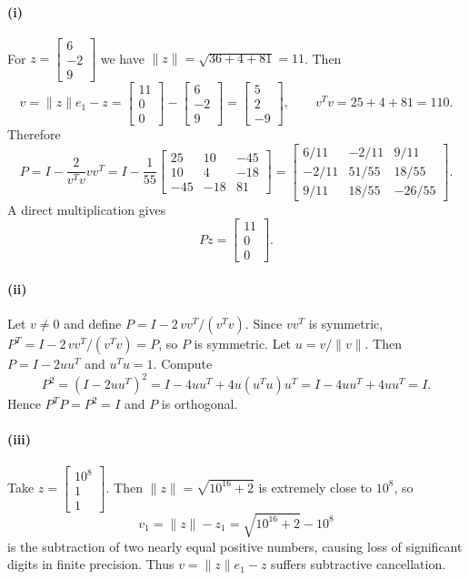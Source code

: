 \documentclass[11pt]{article}
\begin{document}
\paragraph{(i)}
For \(z=\begin{bmatrix}6\\ -2\\ 9\end{bmatrix}\) we have \(\|z\|=\sqrt{36+4+81}=11\). Then
\[
v=\|z\|e_1-z=\begin{bmatrix}11\\0\\0\end{bmatrix}-\begin{bmatrix}6\\-2\\9\end{bmatrix}
=\begin{bmatrix}5\\2\\-9\end{bmatrix},
\qquad
v^{T}v=25+4+81=110.
\]
Therefore
\[
P=I-\frac{2}{v^{T}v}vv^{T}
=I-\frac{1}{55}\begin{bmatrix}
25&10&-45\\
10&4&-18\\
-45&-18&81
\end{bmatrix}
=
\begin{bmatrix}
6/11&-2/11&9/11\\
-2/11&51/55&18/55\\
9/11&18/55&-26/55
\end{bmatrix}.
\]
A direct multiplication gives
\[
Pz=\begin{bmatrix}11\\0\\0\end{bmatrix}.
\]

\paragraph{(ii)}
Let \(v\neq 0\) and define \(P=I-2\,vv^{T}/(v^{T}v)\). Since \(vv^{T}\) is symmetric, \(P^{T}=I-2\,vv^{T}/(v^{T}v)=P\), so \(P\) is symmetric.
Let \(u=v/\|v\|\). Then \(P=I-2uu^{T}\) and \(u^{T}u=1\). Compute
\[
P^{2}=(I-2uu^{T})^{2}=I-4uu^{T}+4u(u^{T}u)u^{T}=I-4uu^{T}+4uu^{T}=I.
\]
Hence \(P^{T}P=P^{2}=I\) and \(P\) is orthogonal.

\paragraph{(iii)}
Take \(z=\begin{bmatrix}10^{8}\\1\\1\end{bmatrix}\). Then \(\|z\|=\sqrt{10^{16}+2}\) is extremely close to \(10^{8}\), so
\[
v_1=\|z\|-z_1=\sqrt{10^{16}+2}-10^{8}
\]
is the subtraction of two nearly equal positive numbers, causing loss of significant digits in finite precision. Thus \(v=\|z\|e_1-z\) suffers subtractive cancellation.
\end{document}
